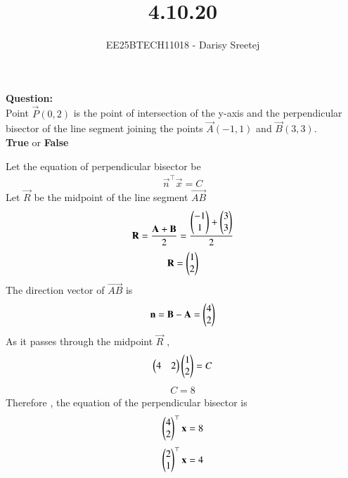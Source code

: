 \documentclass[journal,12pt,onecolumn]{IEEEtran}
\begin{document}
\title{4.10.20}
\author{EE25BTECH11018 - Darisy Sreetej}
{\let\newpage\relax\maketitle}
\textbf{Question:}\\
Point $\vec{P}(0, 2)$ is the point of intersection of the y-axis and the perpendicular bisector of the line segment joining the points $\vec{A}(-1,1)$ and $\vec{B}(3,3).$\\
\textbf{True} or \textbf{False}\\ 
\solution
\begin{table}[H]
	\centering
	\caption{}
	
	\label{}
\end{table}
Let the equation of perpendicular bisector be
\begin{align}
	\vec{n}^\top\vec{x}=C
\end{align}
Let $\vec{R}$ be the midpoint of the line segment $\vec{AB}$
\begin{align}
    \mathbf{R}=\frac{\mathbf{A}+\mathbf{B}}{2} = \frac{\begin{pmatrix}-1\\1\end{pmatrix}+\begin{pmatrix}3\\3\end{pmatrix}}{2}
\end{align}
\begin{align}
    \mathbf{R}=\begin{pmatrix}1\\2\end{pmatrix}
\end{align}
The direction vector of $\vec{AB}$ is 
\begin{align}
	\mathbf{n}=\mathbf{B}-\mathbf{A}=\begin{pmatrix}4\\2\end{pmatrix}
\end{align}
As it passes through the midpoint $\vec{R}$ ,
\begin{align}
\begin{pmatrix}4&2\end{pmatrix}\begin{pmatrix}1\\2\end{pmatrix}=C
\end{align}
\begin{align}
	C=8
\end{align}
Therefore , the equation of the perpendicular bisector is 
\begin{align}
	\begin{pmatrix}4\\2\end{pmatrix}^\top\mathbf{x}=8
\end{align}
\begin{align}
	\begin{pmatrix}2\\1\end{pmatrix}^\top\mathbf{x}=4
\end{align}
\end{document}

